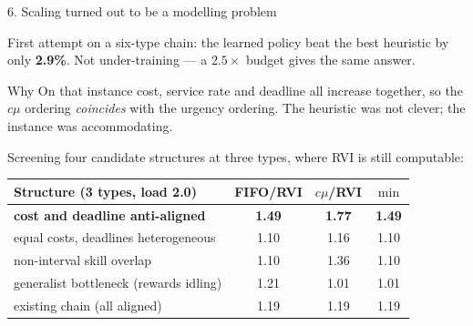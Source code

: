 \documentclass[11pt,aspectratio=169]{beamer}
\newcommand{\good}[1]{\textbf{#1}}
\begin{document}
\begin{frame}{6. Scaling turned out to be a modelling problem}

First attempt on a six-type chain: the learned policy beat the best heuristic by
only \good{2.9\%}.  Not under-training --- a $2.5\times$ budget gives the same
answer.

\vfill
\begin{alertblock}{Why}
On that instance cost, service rate and deadline all increase together, so the
$c\mu$ ordering \emph{coincides} with the urgency ordering.  The heuristic was
not clever; the instance was accommodating.
\end{alertblock}

\vfill
Screening four candidate structures at three types, where RVI is still
computable:

\begin{center}
\small
\begin{tabular}{lccc}
\toprule
Structure (3 types, load 2.0) & FIFO/RVI & $c\mu$/RVI & $\min$ \\
\midrule
\good{cost and deadline anti-aligned} & \good{1.49} & \good{1.77} & \good{1.49} \\
equal costs, deadlines heterogeneous  & 1.10 & 1.16 & 1.10 \\
non-interval skill overlap            & 1.10 & 1.36 & 1.10 \\
generalist bottleneck (rewards idling)& 1.21 & 1.01 & 1.01 \\
\midrule
existing chain (all aligned)          & 1.19 & 1.19 & 1.19 \\
\bottomrule
\end{tabular}
\end{center}

\end{frame}
\end{document}
